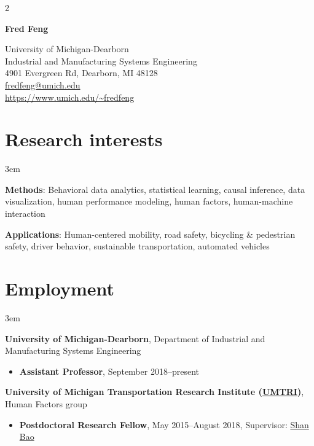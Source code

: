 \documentclass[11pt]{article}
\title{\vspace{-6em}}   %
\author{}
\date{}
\newenvironment{main}
{\begin{adjustwidth}{3em}{}}
{\end{adjustwidth}}
\begin{document}
\maketitle

\begin{multicols}{2}

{\selectfont\Huge\textbf{Fred Feng}}  %

\hfill\break

\begin{flushright}
University of Michigan-Dearborn \\
Industrial and Manufacturing Systems Engineering \\
4901 Evergreen Rd, Dearborn, MI 48128 \\
\href{mailto:fredfeng@umich.edu}{fredfeng@umich.edu} \\
\url{https://www.umich.edu/\~fredfeng} \\
\end{flushright}

\end{multicols}

\vspace{-2em}
\noindent\makebox[\linewidth]{\rule{\textwidth}{0.8pt}}

\section*{Research interests}
\begin{main}

\textbf{Methods}: 
Behavioral data analytics, 
statistical learning, 
causal inference, 
data visualization, 
human performance modeling, 
human factors, 
human-machine interaction

\textbf{Applications}: 
Human-centered mobility, 
road safety, 
bicycling \& pedestrian safety, 
driver behavior, 
sustainable transportation, 
automated vehicles

\end{main}
\section*{Employment}
\begin{main}

\textbf{University of Michigan-Dearborn}, Department of Industrial and Manufacturing Systems Engineering

\begin{itemize}
    \item[] \textbf{Assistant Professor}, September 2018–present
\end{itemize}

\textbf{University of Michigan Transportation Research Institute (\href{http://www.umtri.umich.edu/}{UMTRI})}, Human Factors group

\begin{itemize}
    \item[] \textbf{Postdoctoral Research Fellow}, May 2015–August 2018, Supervisor: \href{https://sites.google.com/umich.edu/hfet-lab/people}{Shan Bao}
\end{itemize}


\end{main}
\end{document}
